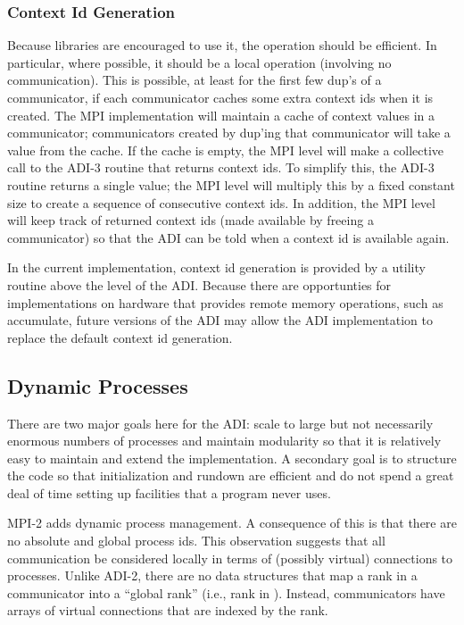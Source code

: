\subsubsection{Context Id Generation}
\label{sec:context-id-generation}
Because libraries are encouraged to use it, the operation
 should be efficient.  In particular, 
where possible, it should be a local operation (involving no
communication).  This is possible, at least for the first few dup's of
a communicator, if each communicator caches some extra context ids
when it is created.  The MPI implementation will maintain a cache of
context values in a communicator; communicators created by dup'ing
that communicator will take a value from the cache.  If the cache is
empty, the MPI level will make a collective call to the ADI-3 routine
that returns context ids.  To simplify this, the ADI-3 routine returns
a single value; the MPI level will multiply this by a fixed constant
size to create a sequence of consecutive context ids.  In addition,
the MPI level will keep track of returned context ids (made available
by freeing a communicator) so that the ADI can be told when a context
id is available again.

In the current implementation, context id generation is provided by a
utility routine above the level of the ADI.  Because there are opportunties
for implementations on hardware that provides remote memory operations,
such as accumulate, future versions of the ADI may allow the ADI
implementation to replace the default context id generation.

\subsection{Dynamic Processes}
There are two major goals here for the ADI:  scale to large but not
necessarily enormous numbers of processes and maintain modularity so
that it is relatively easy to maintain and extend the implementation.
A secondary goal is to structure the code so that initialization and
rundown are efficient and do not spend a great deal of time setting up
facilities that a program never uses.

MPI-2 adds dynamic process management.  A consequence of this is that
there are no absolute and global process ids.  This observation
suggests that all communication be considered locally in terms of
(possibly virtual) connections to processes.  Unlike ADI-2, there are
no data structures that map a rank in a communicator into a ``global
rank'' (i.e., rank in ).  Instead, communicators
have arrays of virtual connections that are indexed by the rank.

